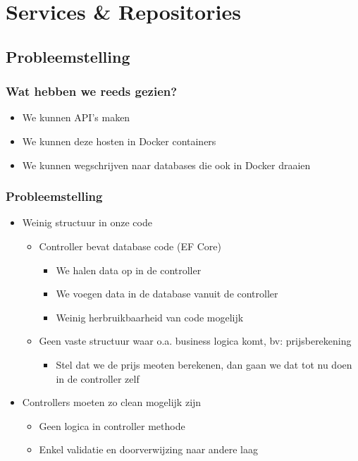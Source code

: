 \documentclass{article}
\begin{document}
\section{Services \& Repositories}

\subsection{Probleemstelling}

\subsubsection{Wat hebben we reeds gezien?}

\begin{itemize}
    \item We kunnen API's maken
    \item We kunnen deze hosten in Docker containers
    \item We kunnen wegschrijven naar databases die ook in Docker draaien
\end{itemize}

\subsubsection{Probleemstelling}

\begin{itemize}
    \item Weinig structuur in onze code
    \begin{itemize}
        \item Controller bevat database code (EF Core)
        \begin{itemize}
            \item We halen data op in de controller
            \item We voegen data in de database vanuit de controller
            \item Weinig herbruikbaarheid van code mogelijk
        \end{itemize}
        \item Geen vaste structuur waar o.a. business logica komt, bv: prijsberekening
        \begin{itemize}
            \item Stel dat we de prijs meoten berekenen, dan gaan we dat tot nu doen in de controller zelf
        \end{itemize}
    \end{itemize}
    \item Controllers moeten zo clean mogelijk zijn
    \begin{itemize}
        \item Geen logica in controller methode
        \item Enkel validatie en doorverwijzing naar andere laag
    \end{itemize}
\end{itemize}
\end{document}
